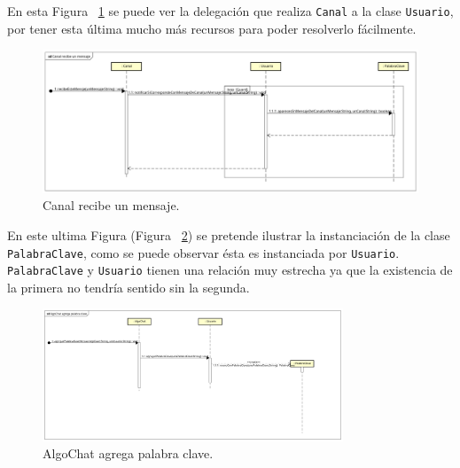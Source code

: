 \documentclass[titlepage,a4paper]{article}
\begin{document}
En esta Figura ~\ref{fig:seq03} se puede ver la delegación que realiza \verb|Canal| a la clase \verb|Usuario|, por tener esta última mucho más recursos para poder resolverlo fácilmente.
\begin{figure}[H]
\centering
\includegraphics[width=\textwidth]{DiagramasDeSecuencias/Canal_recibe_un_mensaje.png}
\caption{\label{fig:seq03}Canal recibe un mensaje.}
\end{figure}
En este ultima Figura (Figura ~\ref{fig:seq04}) se pretende ilustrar la instanciación de la clase \verb|PalabraClave|, como se puede observar ésta es instanciada por \verb|Usuario|.\\\verb|PalabraClave| y \verb|Usuario| tienen una relación muy estrecha ya que la existencia de la primera no tendría sentido sin la segunda.
\begin{figure}[H]
\centering
\includegraphics[width=0.8\textwidth]{DiagramasDeSecuencias/AlgoChat_agrega_palabra_clave.png}
\caption{\label{fig:seq04}AlgoChat agrega palabra clave.}
\end{figure}
\end{document}
